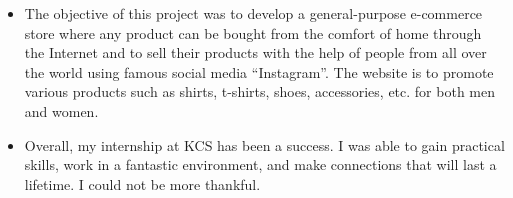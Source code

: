 \begin{itemize}
\item	The objective of this project was to develop a general-purpose e-commerce store where any product can be bought from the comfort of home through the Internet and to sell their products with the help of people from all over the world using famous social media “Instagram”. The website is to promote various products such as shirts, t-shirts, shoes, accessories, etc. for both men and women.\\



\item	Overall, my internship at KCS has been a success. I was able to gain practical skills, work in a fantastic environment, and make connections that will last a lifetime. I could not be more thankful.

\end{itemize}